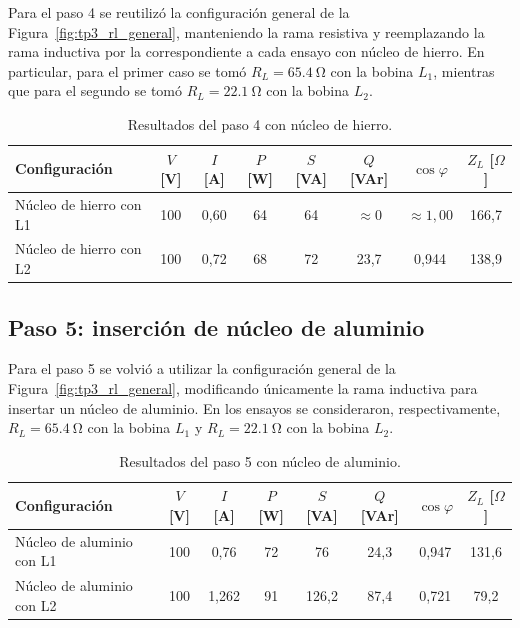 \documentclass[a4paper,12pt]{article}
\begin{document}
Para el paso 4 se reutilizó la configuración general de la Figura~\ref{fig:tp3_rl_general}, manteniendo la rama resistiva y reemplazando la rama inductiva por la correspondiente a cada ensayo con núcleo de hierro. En particular, para el primer caso se tomó $R_L=\SI{65,4}{\ohm}$ con la bobina $L_1$, mientras que para el segundo se tomó $R_L=\SI{22,1}{\ohm}$ con la bobina $L_2$.

\begin{table}[H]
    \centering
    \caption{Resultados del paso 4 con núcleo de hierro.}
    \label{tab:tp3_paso4}
    \begin{tabular}{>{\raggedright\arraybackslash}p{}ccccccc}
        \toprule
        Configuración & $V$ [V] & $I$ [A] & $P$ [W] & $S$ [VA] & $Q$ [VAr] & $\cos\varphi$ & $Z_L$ [$\Omega$] \\
        \midrule
        Núcleo de hierro con L1 & 100 & 0,60 & 64 & 64 & $\approx 0$ & $\approx 1,00$ & 166,7 \\
        Núcleo de hierro con L2 & 100 & 0,72 & 68 & 72 & 23,7 & 0,944 & 138,9 \\
        \bottomrule
    \end{tabular}
\end{table}

\subsection{Paso 5: inserción de núcleo de aluminio}

Para el paso 5 se volvió a utilizar la configuración general de la Figura~\ref{fig:tp3_rl_general}, modificando únicamente la rama inductiva para insertar un núcleo de aluminio. En los ensayos se consideraron, respectivamente, $R_L=\SI{65,4}{\ohm}$ con la bobina $L_1$ y $R_L=\SI{22,1}{\ohm}$ con la bobina $L_2$.

\begin{table}[H]
    \centering
    \caption{Resultados del paso 5 con núcleo de aluminio.}
    \label{tab:tp3_paso5}
    \begin{tabular}{>{\raggedright\arraybackslash}p{}ccccccc}
        \toprule
        Configuración & $V$ [V] & $I$ [A] & $P$ [W] & $S$ [VA] & $Q$ [VAr] & $\cos\varphi$ & $Z_L$ [$\Omega$] \\
        \midrule
        Núcleo de aluminio con L1 & 100 & 0,76 & 72 & 76 & 24,3 & 0,947 & 131,6 \\
        Núcleo de aluminio con L2 & 100 & 1,262 & 91 & 126,2 & 87,4 & 0,721 & 79,2 \\
        \bottomrule
    \end{tabular}
\end{table}
\end{document}
